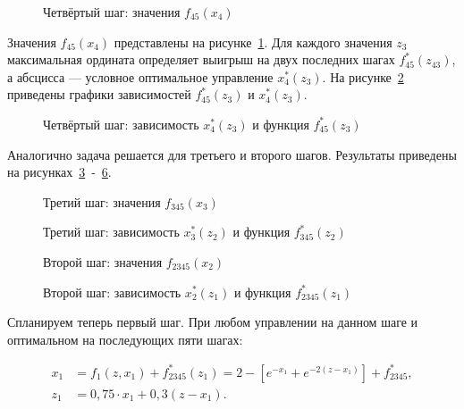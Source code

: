 \begin{figure}[h!]
  \caption{Четвёртый шаг: значения $f_{45}(x_4)$\label{figure:family_4}}
\end{figure}

Значения $f_{45}(x_4)$ представлены на рисунке~\ref{figure:family_4}. Для каждого значения $z_3$ максимальная ордината определяет выигрыш на двух последних шагах $f^*_{45}(z_{43})$, а абсцисса --- условное оптимальное управление $x^*_4(z_3)$. На рисунке~\ref{figure:opts_4} приведены графики зависимостей $f^*_{45}(z_3)$ и $x^*_4(z_3)$. 

\begin{figure}[h!]
  \caption{Четвёртый шаг: зависимость  $x^*_4(z_3)$ и функция $ f^*_{45}(z_3) $ \label{figure:opts_4}}
\end{figure}

\newpage

Аналогично задача решается для третьего и второго шагов. Результаты приведены на рисунках~\ref{figure:family_3}~-~\ref{figure:opts_2}.

\begin{figure}[h!]
  \caption{Третий шаг: значения $f_{345}(x_3)$\label{figure:family_3}}
\end{figure}

\begin{figure}[h!]
  \caption{Третий шаг: зависимость  $x^*_3(z_2)$ и функция $ f^*_{345}(z_2) $\label{figure:opts_3}}
\end{figure}

\begin{figure}[h!]
  \caption{Второй шаг: значения $f_{2345}(x_2)$\label{figure:family_2}}
\end{figure}

\begin{figure}[h!]
  \caption{Второй шаг: зависимость  $x^*_2(z_1)$ и функция $ f^*_{2345}(z_1) $\label{figure:opts_2}}
\end{figure}

Спланируем теперь первый шаг. При любом управлении на данном шаге и оптимальном на последующих пяти шагах:

\begin{equation}
  \begin{aligned}
    x_1 &= f_1(z, x_1) + f^*_{2345}(z_1) = 2-[e^{-x_1} + e^{-2(z-x_1)}] + f^*_{2345}, \\
    z_1 &= 0,75 \cdot x_1 + 0,3 (z - x_1).
  \end{aligned}
\end{equation}

